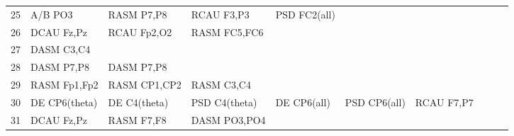 \begin{landscape}
\begin{table}[]
\begin{tabular}{l|llllllll}
25       & A/B PO3               & RASM P7,P8            & RCAU F3,P3           & PSD FC2(all)            &                         &                      &                      &                       &                       &                    \\
26       & DCAU Fz,Pz            & RCAU Fp2,O2           & RASM FC5,FC6         &                         &                         &                      &                      &                       &                       &                    \\
27       & DASM C3,C4            &                       &                      &                         &                         &                      &                      &                       &                       &                    \\
28       & DASM P7,P8            & DASM P7,P8            &                      &                         &                         &                      &                      &                       &                       &                    \\
29       & RASM Fp1,Fp2          & RASM CP1,CP2          & RASM C3,C4           &                         &                         &                      &                      &                       &                       &                    \\
30       & DE CP6(theta)         & DE C4(theta)          & PSD C4(theta)        & DE CP6(all)             & PSD CP6(all)            & RCAU F7,P7           &                      &                       &                       &                    \\
31       & DCAU Fz,Pz            & RASM F7,F8            & DASM PO3,PO4         &                         &                         &                      &                      &                       &                       &                    \\
\end{tabular}
\end{table}
\end{landscape}
\clearpage
